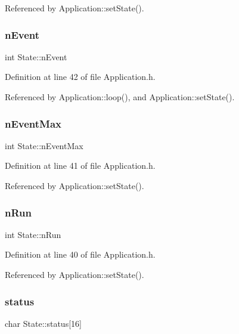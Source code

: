 Referenced by Application\+::set\+State().

\mbox{\label{classState_af9d335bba28d6946043a07b047556690}} 
\subsubsection{\texorpdfstring{n\+Event}{nEvent}}
{\footnotesize\ttfamily int State\+::n\+Event}



Definition at line 42 of file Application.\+h.



Referenced by Application\+::loop(), and Application\+::set\+State().

\mbox{\label{classState_ac57f536cfe9e9819dfc891ed00dabfe3}} 
\subsubsection{\texorpdfstring{n\+Event\+Max}{nEventMax}}
{\footnotesize\ttfamily int State\+::n\+Event\+Max}



Definition at line 41 of file Application.\+h.



Referenced by Application\+::set\+State().

\mbox{\label{classState_aa29a124a8d6060a02bd2468480d7bbd3}} 
\subsubsection{\texorpdfstring{n\+Run}{nRun}}
{\footnotesize\ttfamily int State\+::n\+Run}



Definition at line 40 of file Application.\+h.



Referenced by Application\+::set\+State().

\mbox{\label{classState_aaec062c78d5602d066a7960a2e08e1cd}} 
\subsubsection{\texorpdfstring{status}{status}}
{\footnotesize\ttfamily char State\+::status\mbox{[}16\mbox{]}}



